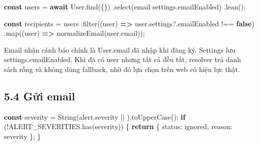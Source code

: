 \documentclass[11pt,oneside,openany]{book}
\renewcommand{\texttt}[1]{{\ttfamily\small #1}}
\newenvironment{Shaded}{\begin{snugshade}}{\end{snugshade}}
\newcommand{\AttributeTok}[1]{\textcolor[rgb]{0.16,0.50,0.73}{#1}}
\newcommand{\BuiltInTok}[1]{\textcolor[rgb]{0.50,0.55,0.55}{#1}}
\newcommand{\ControlFlowTok}[1]{\textcolor[rgb]{0.99,0.74,0.29}{\textbf{#1}}}
\newcommand{\DataTypeTok}[1]{\textcolor[rgb]{0.16,0.50,0.73}{#1}}
\newcommand{\FunctionTok}[1]{\textcolor[rgb]{0.56,0.27,0.68}{#1}}
\newcommand{\KeywordTok}[1]{\textcolor[rgb]{0.81,0.81,0.76}{\textbf{#1}}}
\newcommand{\NormalTok}[1]{\textcolor[rgb]{0.81,0.81,0.76}{#1}}
\newcommand{\OperatorTok}[1]{\textcolor[rgb]{0.81,0.81,0.76}{#1}}
\newcommand{\StringTok}[1]{\textcolor[rgb]{0.96,0.31,0.31}{#1}}
\renewenvironment{Shaded}{%
  \def\FrameCommand{\fboxsep=8pt\colorbox{shadecolor}}%
  \MakeFramed{\advance\hsize-\width\FrameRestore}%
}{\endMakeFramed}
\begin{document}
\begin{Shaded}
\begin{Highlighting}[]
\KeywordTok{const}\NormalTok{ users }\OperatorTok{=} \ControlFlowTok{await}\NormalTok{ User}\OperatorTok{.}\FunctionTok{find}\NormalTok{(\{\})}
  \OperatorTok{.}\FunctionTok{select}\NormalTok{(}\StringTok{\textquotesingle{}email settings.emailEnabled\textquotesingle{}}\NormalTok{)}
  \OperatorTok{.}\FunctionTok{lean}\NormalTok{()}\OperatorTok{;}

\KeywordTok{const}\NormalTok{ recipients }\OperatorTok{=}\NormalTok{ users}
  \OperatorTok{.}\FunctionTok{filter}\NormalTok{((user) }\KeywordTok{=\textgreater{}}\NormalTok{ user}\OperatorTok{.}\AttributeTok{settings}\OperatorTok{?.}\AttributeTok{emailEnabled} \OperatorTok{!==} \KeywordTok{false}\NormalTok{)}
  \OperatorTok{.}\FunctionTok{map}\NormalTok{((user) }\KeywordTok{=\textgreater{}} \FunctionTok{normalizeEmail}\NormalTok{(user}\OperatorTok{.}\AttributeTok{email}\NormalTok{))}\OperatorTok{;}
\end{Highlighting}
\end{Shaded}

Email nhận cảnh báo chính là \texttt{User.email} đã nhập khi đăng ký.
Settings lưu \texttt{settings.emailEnabled}. Khi đã có user nhưng tất cả
đều tắt, resolver trả danh sách rỗng và không dùng fallback, nhờ đó lựa
chọn trên web có hiệu lực thật.

\subsection{5.4 Gửi email}\label{54-gux1eedi-email}

\begin{Shaded}
\begin{Highlighting}[]
\KeywordTok{const}\NormalTok{ severity }\OperatorTok{=} \BuiltInTok{String}\NormalTok{(alert}\OperatorTok{.}\AttributeTok{severity} \OperatorTok{||} \StringTok{\textquotesingle{}\textquotesingle{}}\NormalTok{)}\OperatorTok{.}\FunctionTok{toUpperCase}\NormalTok{()}\OperatorTok{;}
\ControlFlowTok{if}\NormalTok{ (}\OperatorTok{!}\NormalTok{ALERT\_SEVERITIES}\OperatorTok{.}\FunctionTok{has}\NormalTok{(severity)) \{}
  \ControlFlowTok{return}\NormalTok{ \{ }\DataTypeTok{status}\OperatorTok{:} \StringTok{\textquotesingle{}ignored\textquotesingle{}}\OperatorTok{,} \DataTypeTok{reason}\OperatorTok{:} \StringTok{\textquotesingle{}severity\textquotesingle{}}\NormalTok{ \}}\OperatorTok{;}
\NormalTok{\}}
\end{Highlighting}
\end{Shaded}
\end{document}
